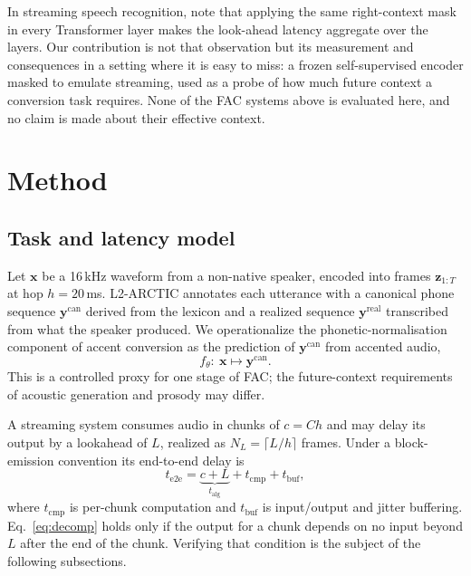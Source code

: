 \documentclass[preprint,12pt,authoryear]{elsarticle}
\newcommand{\talg}{\ensuremath{t_{\mathrm{alg}}}}
\newcommand{\tcmp}{\ensuremath{t_{\mathrm{cmp}}}}
\newcommand{\tbuf}{\ensuremath{t_{\mathrm{buf}}}}
\begin{document}
In streaming speech recognition, \citet{zhang2020transformertransducer} note that applying the same
right-context mask in every Transformer layer makes the look-ahead latency
aggregate over the layers. Our contribution is not that observation but its
measurement and consequences in a setting where it is easy to miss: a frozen
self-supervised encoder masked to emulate streaming, used as a probe of how
much future context a conversion task requires. None of the FAC systems above
is evaluated here, and no claim is made about their effective context.

\section{Method}
\label{sec:method}

\subsection{Task and latency model}
\label{sec:formulation}

Let $\mathbf{x}$ be a 16\,kHz waveform from a non-native speaker, encoded into
frames $\mathbf{z}_{1:T}$ at hop $h=20$\,ms. L2-ARCTIC \citep{l2arctic2018}
annotates each utterance with a canonical phone sequence
$\mathbf{y}^{\mathrm{can}}$ derived from the lexicon and a realized sequence
$\mathbf{y}^{\mathrm{real}}$ transcribed from what the speaker produced. We
operationalize the phonetic-normalisation component of accent conversion as
the prediction of $\mathbf{y}^{\mathrm{can}}$ from accented audio,
\begin{equation}
f_\theta:\ \mathbf{x} \longmapsto \mathbf{y}^{\mathrm{can}}.
\label{eq:task}
\end{equation}
This is a controlled proxy for one stage of FAC; the future-context
requirements of acoustic generation and prosody may differ.

A streaming system consumes audio in chunks of $c=Ch$ and may delay its
output by a lookahead of $L$, realized as $N_L=\lceil L/h\rceil$ frames. Under
a block-emission convention its end-to-end delay is
\begin{equation}
t_{\mathrm{e2e}} = \underbrace{c + L}_{\talg} + \tcmp + \tbuf ,
\label{eq:decomp}
\end{equation}
where \tcmp{} is per-chunk computation and \tbuf{} is input/output and jitter
buffering. Eq.~\ref{eq:decomp} holds only if the output for a chunk depends on
no input beyond $L$ after the end of the chunk. Verifying that condition is
the subject of the following subsections.
\end{document}
